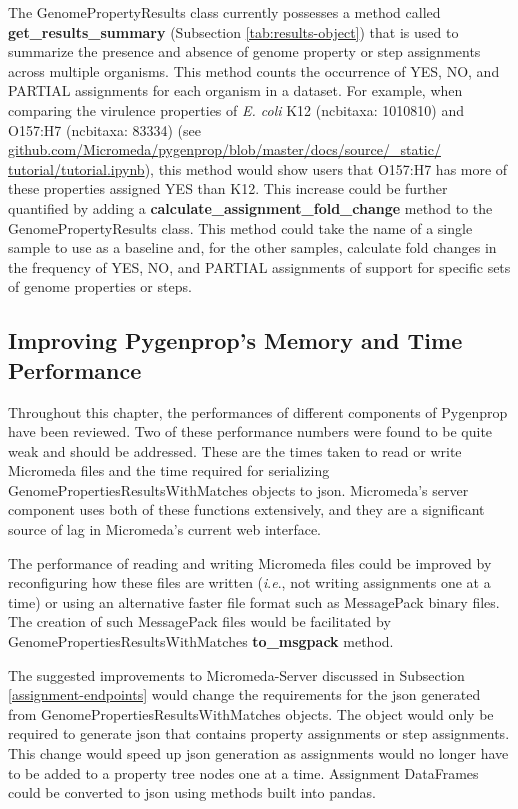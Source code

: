 The GenomePropertyResults class currently possesses a method called 
\textbf{get\_results\_summary} (Subsection \ref{tab:results-object}) that is 
used to summarize the presence and absence of genome property or step 
assignments across multiple organisms. This method counts the occurrence of YES, 
NO, and PARTIAL assignments for each organism in a dataset. For example, when 
comparing the virulence properties of \textit{E. coli} K12 (\gls{ncbitaxa}: 
1010810) and O157:H7 (\gls{ncbitaxa}: 83334) (see 
\href{http://github.com/Micromeda/pygenprop/blob/master/docs/source/_static/tutorial/tutorial.ipynb}{github.com/Micromeda/pygenprop/blob/master/docs/source/\_static/ 
tutorial/tutorial.ipynb}), this method would show users that O157:H7 has more of 
these properties assigned YES than K12. This increase could be further 
quantified by adding a \textbf{calculate\_assignment\_fold\_change} method to 
the GenomePropertyResults class. This method could take the name of a single 
sample to use as a baseline and, for the other samples, calculate fold changes 
in the frequency of YES, NO, and PARTIAL assignments of support for specific 
sets of genome properties or steps.

\subsection{Improving Pygenprop's Memory and Time Performance} 
\label{improving-pygenprop-performance}

Throughout this chapter, the performances of different components of Pygenprop 
have been reviewed. Two of these performance numbers were found to be quite weak 
and should be addressed. These are the times taken to read or write 
Micromeda files and the time required for serializing 
GenomePropertiesResultsWithMatches objects to \gls{json}. Micromeda's server 
component uses both of these functions extensively, and they are a significant 
source of lag in Micromeda's current web interface.

The performance of reading and writing Micromeda files could be improved by 
reconfiguring how these files are written (\textit{i}.\textit{e}., not writing assignments one at 
a time) or using an alternative faster file format such as MessagePack binary 
files. The creation of such MessagePack files would be facilitated by 
GenomePropertiesResultsWithMatches \textbf{to\_msgpack} method. 
 
The suggested improvements to Micromeda-Server discussed in Subsection 
\ref{assignment-endpoints} would change the requirements for the \gls{json} 
generated from GenomePropertiesResultsWithMatches objects. The object would only 
be required to generate \gls{json} that contains property assignments or step 
assignments. This change would speed up \gls{json} generation as assignments 
would no longer have to be added to a property tree nodes one at a time. 
Assignment DataFrames could be converted to \gls{json} using methods built into 
pandas.

